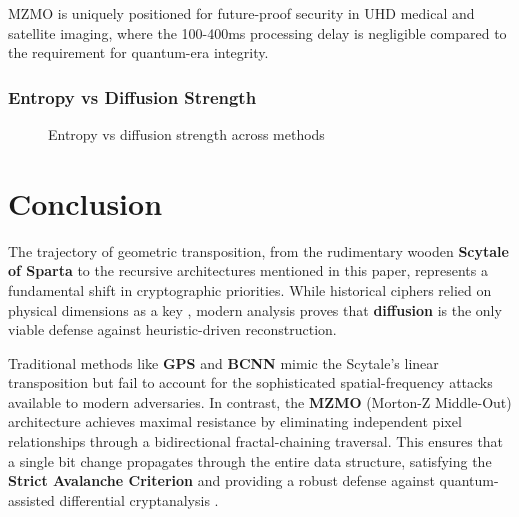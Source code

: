 \documentclass[12pt,fleqn]{article}
\begin{document}
MZMO is uniquely positioned for future-proof security in UHD medical and satellite imaging, where the 100-400ms processing delay is negligible compared to the requirement for quantum-era integrity.

\subsubsection{Entropy vs Diffusion Strength}

\begin{figure}[H]
\raggedright
{}
\caption{Entropy vs diffusion strength across methods}
\end{figure}

\section{Conclusion}

The trajectory of geometric transposition, from the rudimentary wooden \textbf{Scytale of Sparta} to the recursive architectures mentioned in this paper, represents a fundamental shift in cryptographic priorities. While historical ciphers relied on physical dimensions as a key \cite{kelly2011scytale}, modern analysis proves that \textbf{diffusion} is the only viable defense against heuristic-driven reconstruction.

Traditional methods like \textbf{GPS} and \textbf{BCNN} mimic the Scytale’s linear transposition but fail to account for the sophisticated spatial-frequency attacks available to modern adversaries. In contrast, the \textbf{MZMO} (Morton-Z Middle-Out) architecture achieves maximal resistance by eliminating independent pixel relationships through a bidirectional fractal-chaining traversal. This ensures that a single bit change propagates through the entire data structure, satisfying the \textbf{Strict Avalanche Criterion} \cite{feistel1973crypto} and providing a robust defense against quantum-assisted differential cryptanalysis \cite{shor1994algorithms}.
\end{document}
